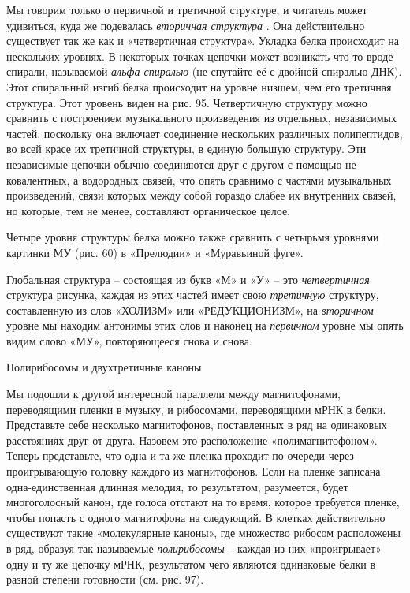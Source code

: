 \documentclass[../main.tex]{subfiles}
\begin{document}
Мы говорим только о первичной и третичной структуре, и читатель может удивиться, куда же подевалась \emph{вторичная структура} . Она действительно существует так же как и «четвертичная структура». Укладка белка происходит на нескольких уровнях. В некоторых точках цепочки может возникать что-то вроде спирали, называемой \emph{альфа спиралью} (не спутайте её с двойной спиралью ДНК). Этот спиральный изгиб белка происходит на уровне низшем, чем его третичная структура. Этот уровень виден на рис. 95. Четвертичную структуру можно сравнить с построением музыкального произведения из отдельных, независимых частей, поскольку она включает соединение нескольких различных полипептидов, во всей красе их третичной структуры, в единую большую структуру. Эти независимые цепочки обычно соединяются друг с другом с помощью не ковалентных, а водородных связей, что опять сравнимо с частями музыкальных произведений, связи которых между собой гораздо слабее их внутренних связей, но которые, тем не менее, составляют органическое целое.

Четыре уровня структуры белка можно также сравнить с четырьмя уровнями картинки МУ (рис. 60) в «Прелюдии» и «Муравьиной фуге».

Глобальная структура \--- состоящая из букв «М» и «У» \--- это \emph{четвертичная} структура рисунка, каждая из этих частей имеет свою \emph{третичную} структуру, составленную из слов «ХОЛИЗМ» или «РЕДУКЦИОНИЗМ», на \emph{вторичном} уровне мы находим антонимы этих слов и наконец на \emph{первичном} уровне мы опять видим слово «МУ», повторяющееся снова и снова.

Полирибосомы и двухтретичные каноны

Мы подошли к другой интересной параллели между магнитофонами, переводящими пленки в музыку, и рибосомами, переводящими мРНК в белки. Представьте себе несколько магнитофонов, поставленных в ряд на одинаковых расстояниях друг от друга. Назовем это расположение «полимагнитофоном». Теперь представьте, что одна и та же пленка проходит по очереди через проигрывающую головку каждого из магнитофонов. Если на пленке записана одна-единственная длинная мелодия, то результатом, разумеется, будет многоголосный канон, где голоса отстают на то время, которое требуется пленке, чтобы попасть с одного магнитофона на следующий. В клетках действительно существуют такие «молекулярные каноны», где множество рибосом расположены в ряд, образуя так называемые \emph{полирибосомы} \--- каждая из них «проигрывает» одну и ту же цепочку мРНК, результатом чего являются одинаковые белки в разной степени готовности (см. рис. 97).
\end{document}
